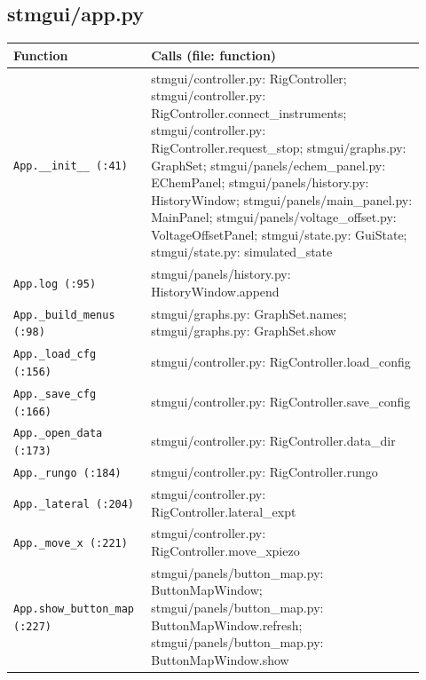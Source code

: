 \subsection{stmgui/app.py}

\small\setlength{\LTleft}{0pt}\setlength{\LTright}{\fill}
\begin{longtable}{@{}>{\raggedright\arraybackslash}p{0.280\linewidth}>{\raggedright\arraybackslash}p{0.640\linewidth}@{}}
\toprule
\textbf{Function} & \textbf{Calls (file: function)} \\
\midrule\endhead
\texttt{App.\discretionary{}{}{}\_\discretionary{}{}{}\_\discretionary{}{}{}init\_\discretionary{}{}{}\_\discretionary{}{}{} (:41)} & stmgui/controller.py: RigController; stmgui/controller.py: RigController.connect\_instruments; stmgui/controller.py: RigController.request\_stop; stmgui/graphs.py: GraphSet; stmgui/panels/echem\_panel.py: EChemPanel; stmgui/panels/history.py: HistoryWindow; stmgui/panels/main\_panel.py: MainPanel; stmgui/panels/voltage\_offset.py: VoltageOffsetPanel; stmgui/state.py: GuiState; stmgui/state.py: simulated\_state \\
\texttt{App.\discretionary{}{}{}log (:95)} & stmgui/panels/history.py: HistoryWindow.append \\
\texttt{App.\discretionary{}{}{}\_\discretionary{}{}{}build\_\discretionary{}{}{}menus (:98)} & stmgui/graphs.py: GraphSet.names; stmgui/graphs.py: GraphSet.show \\
\texttt{App.\discretionary{}{}{}\_\discretionary{}{}{}load\_\discretionary{}{}{}cfg (:156)} & stmgui/controller.py: RigController.load\_config \\
\texttt{App.\discretionary{}{}{}\_\discretionary{}{}{}save\_\discretionary{}{}{}cfg (:166)} & stmgui/controller.py: RigController.save\_config \\
\texttt{App.\discretionary{}{}{}\_\discretionary{}{}{}open\_\discretionary{}{}{}data (:173)} & stmgui/controller.py: RigController.data\_dir \\
\texttt{App.\discretionary{}{}{}\_\discretionary{}{}{}rungo (:184)} & stmgui/controller.py: RigController.rungo \\
\texttt{App.\discretionary{}{}{}\_\discretionary{}{}{}lateral (:204)} & stmgui/controller.py: RigController.lateral\_expt \\
\texttt{App.\discretionary{}{}{}\_\discretionary{}{}{}move\_\discretionary{}{}{}x (:221)} & stmgui/controller.py: RigController.move\_xpiezo \\
\texttt{App.\discretionary{}{}{}show\_\discretionary{}{}{}button\_\discretionary{}{}{}map (:227)} & stmgui/panels/button\_map.py: ButtonMapWindow; stmgui/panels/button\_map.py: ButtonMapWindow.refresh; stmgui/panels/button\_map.py: ButtonMapWindow.show \\

\end{longtable}
